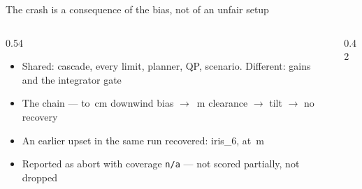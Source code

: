 \documentclass[aspectratio=169,11pt,t]{beamer}
\begin{document}
\begin{frame}{The crash is a consequence of the bias, not of an unfair setup}
  \label{q:crash}
  \begin{columns}[T,onlytextwidth]
    \begin{column}{0.54\textwidth}
      \begin{itemize}\bulletgap\small
        \item Shared: cascade, every limit, planner, QP, scenario. Different:
              gains and the integrator gate
        \item The chain --- \LatMeanLqrMin{} to \LatMeanLqrMax\,cm downwind bias
              $\rightarrow$ \UpRectLqrSurf\,m clearance $\rightarrow$ tilt
              \UpRectLqrTilt\textdegree{} $\rightarrow$ no recovery
        \item An earlier upset in the same run recovered: iris\_6,
              \UpRectLqrSecondTilt\textdegree{} at \UpRectLqrSecondSurf\,m
        \item Reported as abort with coverage \texttt{n/a} --- not scored
              partially, not dropped
      \end{itemize}
    \end{column}
    \begin{column}{0.42\textwidth}
    \end{column}
  \end{columns}
\end{frame}
\end{document}
